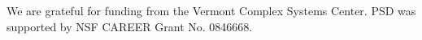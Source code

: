 We are grateful for funding from the Vermont Complex
Systems Center.
PSD was supported by NSF CAREER Grant No. 0846668.
